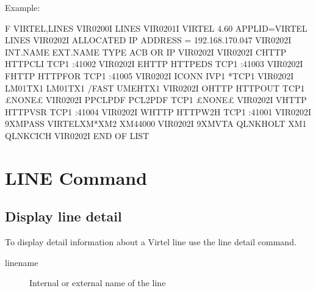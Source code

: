 \documentclass[letterpaper,10pt,english]{sphinxmanual}
\begin{document}
Example:

\begin{sphinxVerbatim}[commandchars=\\\{\}]
F VIRTEL,LINES
VIR0200I LINES
VIR0201I VIRTEL 4.60 APPLID=VIRTEL  LINES
VIR0202I ALLOCATED IP ADDRESS = 192.168.170.047
VIR0202I INT.NAME EXT.NAME TYPE  ACB OR IP
VIR0202I \PYGZhy{}\PYGZhy{}\PYGZhy{}\PYGZhy{}\PYGZhy{}\PYGZhy{}\PYGZhy{}\PYGZhy{} \PYGZhy{}\PYGZhy{}\PYGZhy{}\PYGZhy{}\PYGZhy{}\PYGZhy{}\PYGZhy{}\PYGZhy{} \PYGZhy{}\PYGZhy{}\PYGZhy{}\PYGZhy{}\PYGZhy{} \PYGZhy{}\PYGZhy{}\PYGZhy{}\PYGZhy{}\PYGZhy{}\PYGZhy{}\PYGZhy{}\PYGZhy{}\PYGZhy{}
VIR0202I C\PYGZhy{}HTTP   HTTP\PYGZhy{}CLI TCP1  :41002
VIR0202I E\PYGZhy{}HTTP   HTTP\PYGZhy{}EDS TCP1  :41003
VIR0202I F\PYGZhy{}HTTP   HTTP\PYGZhy{}FOR TCP1  :41005
VIR0202I I\PYGZhy{}CONN   IVP1    *TCP1
VIR0202I LM01TX1  LM01TX1  /FAST UMEHTX1
VIR0202I O\PYGZhy{}HTTP   HTTP\PYGZhy{}OUT TCP1  £NONE£
VIR0202I P\PYGZhy{}PCLPDF PCL2PDF  TCP1  £NONE£
VIR0202I V\PYGZhy{}HTTP   HTTP\PYGZhy{}VSR TCP1  :41004
VIR0202I W\PYGZhy{}HTTP   HTTP\PYGZhy{}W2H TCP1  :41001
VIR0202I 9\PYGZhy{}XMPASS VIRTELXM*XM2   XM44000
VIR0202I 9\PYGZhy{}XMVTA  QLNKHOLT XM1   QLNKCICH
VIR0202I \PYGZhy{}\PYGZhy{}\PYGZhy{}END OF LIST\PYGZhy{}\PYGZhy{}\PYGZhy{}
\end{sphinxVerbatim}

\ignorespaces 

\section{LINE Command}
\label{\detokenize{audit_operations_ and_performance:line-command}}\label{\detokenize{audit_operations_ and_performance:index-5}}

\subsection{Display line detail}
\label{\detokenize{audit_operations_ and_performance:display-line-detail}}
To display detail information about a Virtel line use the line detail command.

\begin{sphinxVerbatim}[commandchars=\\\{\}]
  
\end{sphinxVerbatim}
\begin{description}
\item[{linename}] \leavevmode
Internal or external name of the line

\end{description}
\end{document}

